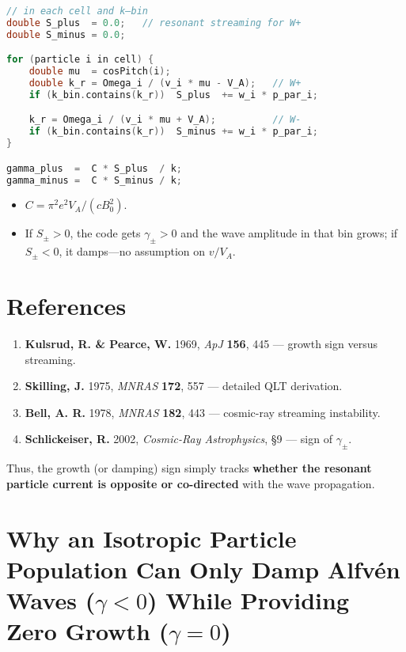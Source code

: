 \begin{lstlisting}[language=C++, basicstyle=\ttfamily\small]
// in each cell and k–bin
double S_plus  = 0.0;   // resonant streaming for W+
double S_minus = 0.0;

for (particle i in cell) {
    double mu  = cosPitch(i);
    double k_r = Omega_i / (v_i * mu - V_A);   // W+
    if (k_bin.contains(k_r))  S_plus  += w_i * p_par_i;

    k_r = Omega_i / (v_i * mu + V_A);          // W-
    if (k_bin.contains(k_r))  S_minus += w_i * p_par_i;
}

gamma_plus  =  C * S_plus  / k;
gamma_minus =  C * S_minus / k;
\end{lstlisting}

\noindent
\begin{itemize}
\item $C = \pi^2 e^2 V_A /(c B_0^2)$.
\item If $S_\pm > 0$, the code gets $\gamma_\pm > 0$ and the wave amplitude in that bin grows; if $S_\pm < 0$, it damps—no assumption on $v/V_A$.
\end{itemize}

\section*{References}

\begin{enumerate}
\item \textbf{Kulsrud, R. \& Pearce, W.} 1969, \textit{ApJ} \textbf{156}, 445 — growth sign versus streaming.
\item \textbf{Skilling, J.} 1975, \textit{MNRAS} \textbf{172}, 557 — detailed QLT derivation.
\item \textbf{Bell, A. R.} 1978, \textit{MNRAS} \textbf{182}, 443 — cosmic-ray streaming instability.
\item \textbf{Schlickeiser, R.} 2002, \textit{Cosmic-Ray Astrophysics}, §9 — sign of $\gamma_\pm$.
\end{enumerate}

\noindent Thus, the growth (or damping) sign simply tracks \textbf{whether the resonant particle current is opposite or co-directed} with the wave propagation.



\section*{Why an \textbf{Isotropic Particle Population} Can \textbf{Only Damp} Alfvén Waves ($\gamma < 0$) While Providing \textbf{Zero Growth} ($\gamma = 0$)}

